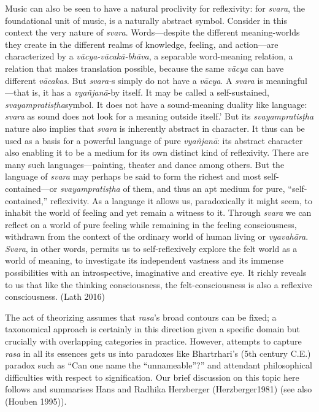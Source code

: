 \begin{myquote}
Music can also be seen to have a natural proclivity for reflexivity: for \textsl{svara}, the foundational unit of music, is a naturally abstract symbol. Consider in this context the very nature of \textsl{svara}. Words—despite the different meaning-worlds they create in the different realms of knowledge, feeling, and action—are characterized by a \textsl{vācya-vācakā-bhāva}, a separable word-meaning relation, a relation that makes translation possible, because the same \textsl{vācya} can have different \textsl{vācakas}. But \textsl{svara-}s simply do not have a \textsl{vācya}. A \textsl{svara} is meaningful—that is, it has a \textsl{vyañjanā}-by itself. It may be called a self-sustained, \textsl{svayampratisṭha}symbol. It does not have a sound-meaning duality like language: \textsl{svara} as sound does not look for a meaning outside itself.' But its \textsl{svayampratisṭha} nature also implies that \textsl{svara} is inherently abstract in character. It thus can be used as a basis for a powerful language of pure \textsl{vyañjanā}: its abstract character also enabling it to be a medium for its own distinct kind of reflexivity. There are many such languages—painting, theater and dance among others. But the language of \textsl{svara} may perhaps be said to form the richest and most self-contained—or \textsl{svayampratisṭha} of them, and thus an apt medium for pure, “self-contained,” reflexivity. As a language it allows us, paradoxically it might seem, to inhabit the world of feeling and yet remain a witness to it. Through \textsl{svara} we can reflect on a world of pure feeling while remaining in the feeling consciousness, withdrawn from the context of the ordinary world of human living or \textsl{vyavahāra}. \textsl{Svara}, in other words, permits us to self-reflexively explore the felt world as a world of meaning, to investigate its independent vastness and its immense possibilities with an introspective, imaginative and creative eye. It richly reveals to us that like the thinking consciousness, the felt-consciousness is also a reflexive consciousness. 
\hfill(Lath 2016)
\end{myquote}

The act of theorizing assumes that \textsl{rasa}’s broad contours can be fixed; a taxonomical approach is certainly in this direction given a specific domain but crucially with overlapping categories in practice. However, attempts to capture \textsl{rasa} in all its essences gets us into paradoxes like Bhartrhari's (5th century C.E.) paradox such as “Can one name the “unnameable”?” and attendant philosophical difficulties with respect to signification. Our brief discussion on this topic here follows and summarises Hans and Radhika Herzberger (Herzberger1981) (see also (Houben 1995)).


